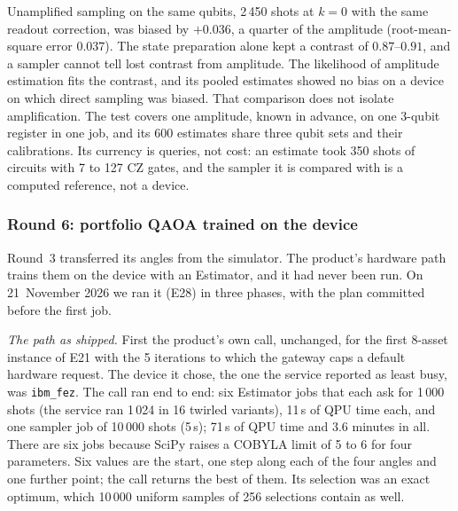 \documentclass[11pt,a4paper]{article}
\begin{document}
Unamplified sampling on the same qubits, 2\,450 shots at $k = 0$ with the
same readout correction, was biased by $+0.036$, a quarter of the amplitude
(root-mean-square error $0.037$). The state preparation alone kept a
contrast of $0.87$--$0.91$, and a sampler cannot tell lost contrast from
amplitude. The likelihood of amplitude estimation fits the contrast, and
its pooled estimates showed no bias on a device on which direct sampling
was biased. That comparison does not isolate amplification. The test covers
one amplitude, known in advance, on one 3-qubit register in one job, and
its 600 estimates share three qubit sets and their calibrations. Its
currency is queries, not cost: an estimate took 350 shots of circuits with
7 to 127 CZ gates, and the sampler it is compared with is a computed
reference, not a device.

\subsubsection{Round 6: portfolio QAOA trained on the device}
\label{sec:res-hw6}

Round~3 transferred its angles from the simulator. The product's hardware
path trains them on the device with an Estimator, and it had never been
run. On 21~November 2026 we ran it (E28) in three phases, with the plan
committed before the first job.

\emph{The path as shipped.} First the product's own call, unchanged, for
the first 8-asset instance of E21 with the 5 iterations to which the
gateway caps a default hardware request. The device it chose, the one the
service reported as least busy, was \texttt{ibm\_fez}. The call ran end to
end: six Estimator jobs that each ask for 1\,000 shots (the service ran
1\,024 in 16 twirled variants),
11\,s of QPU time each, and one sampler job of 10\,000 shots (5\,s); 71\,s
of QPU time and 3.6 minutes in all. There are six jobs because SciPy raises
a COBYLA limit of 5 to 6 for four parameters. Six values are the start, one
step along each of the four angles and one further point; the call returns
the best of them. Its selection was an exact optimum, which 10\,000 uniform
samples of 256 selections contain as well.
\end{document}
